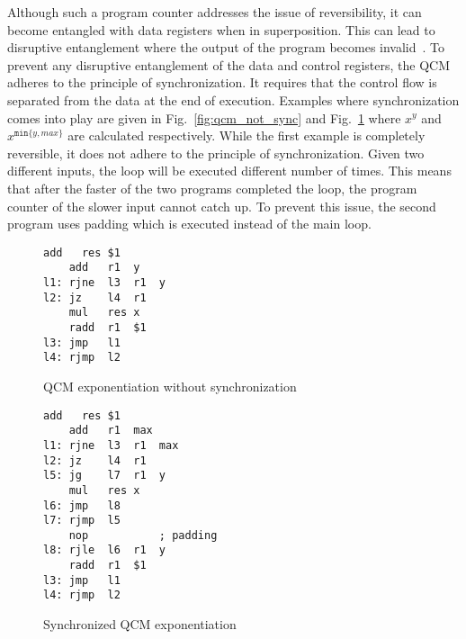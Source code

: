 Although such a program counter addresses the issue of reversibility, it can become entangled with data registers when in superposition. This can lead to disruptive entanglement where the output of the program becomes invalid~\cite{YVC24}. To prevent any disruptive entanglement of the data and control registers, the QCM adheres to the principle of synchronization. 
It requires that the control flow is separated from the data at the end of execution. 
Examples where synchronization comes into play are given in Fig.~\ref{fig:qcm_not_sync} and Fig.~\ref{fig:qcm_sync} where $x^y$ and $x^{\texttt{min}\{y, max\}}$ are calculated respectively. 
While the first example is completely reversible, it does not adhere to the principle of synchronization. Given two different inputs, the loop will be executed different number of times. This means that after the faster of the two programs completed the loop, the program counter of the slower input cannot catch up. To prevent this issue, the second program uses padding which is executed instead of the main loop. 

\begin{figure}[htp]
    \centering     
    \begin{minipage}{.40\textwidth}
        \vspace{7.5em}
        \begin{lstlisting}[linewidth=17em,style=QCM]
    add   res $1
    add   r1  y
l1: rjne  l3  r1  y
l2: jz    l4  r1
    mul   res x
    radd  r1  $1
l3: jmp   l1  
l4: rjmp  l2      
        \end{lstlisting}
        \caption{QCM exponentiation without synchronization}
        \label{fig:qcm_not_sync}
    \end{minipage}
    \hfill
    \begin{minipage}{.55\textwidth}
        \begin{lstlisting}[linewidth=23em,style=QCM]
    add   res $1
    add   r1  max
l1: rjne  l3  r1  max
l2: jz    l4  r1
l5: jg    l7  r1  y   
    mul   res x
l6: jmp   l8  
l7: rjmp  l5
    nop           ; padding
l8: rjle  l6  r1  y
    radd  r1  $1
l3: jmp   l1
l4: rjmp  l2
        \end{lstlisting}
        \caption{Synchronized QCM exponentiation}    
        \label{fig:qcm_sync}
    \end{minipage}
\end{figure}


